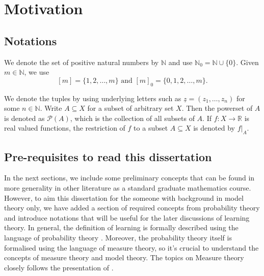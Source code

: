 \section{Motivation}

\subsection{Notations}\label{subsec:notations}

We denote the set of positive natural numbers by $\mathbb{N}$ and use $\mathbb{N}_0 =\mathbb{N} \cup \{0\}$. Given $m \in \mathbb{N}$, we use
\[
    [m] = \{1, 2, \ldots, m\} \textrm{ and }  [m]_0 = \{0, 1, 2, \ldots, m\}.
\]

\noindent
We denote the tuples by using underlying letters such as $\underline{z} = (z_1, \dots, z_n)$ for some $n \in \mathbb{N}$. Write $A \subseteq X$ for a subset of arbitrary set $X$. Then the powerset of  $A$ is denoted as $\mathcal{P}(A)$, which is the collection of all subsets of $A$. If $f : X \to \mathbb{R}$ is real valued functions, the restriction of $f$ to a subset $A \subseteq X$ is denoted by $f|_A$.

\subsection{Pre-requisites to read this dissertation}

In the next sections, we include some preliminary concepts that can be found in more generality in other literature as a standard graduate mathematics course. However, to aim this dissertation for the someone with background in model theory only, we have added a section of required concepts from probability theory and introduce notations that will be useful for the later discussions of learning theory. In general, the definition of learning is formally described using the language of probability theory \cite[Chap 2]{MartinAnthony}. Moreover, the probability theory itself is formalised using the language of measure theory, so it's crucial to understand the concepts of measure theory and model theory. The topics on Measure theory closely follows the presentation of \cite{MeasureTheoryLeGall}.



